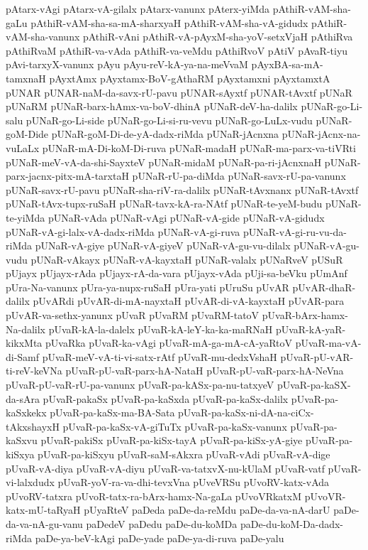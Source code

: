 {pAtarx-vAgi
pAtarx-vA-gilalx
pAtarx-vanunx
pAterx-yiMda
pAthiR-vAM-sha-gaLu
pAthiR-vAM-sha-sa-mA-sharxyaH
pAthiR-vAM-sha-vA-gidudx
pAthiR-vAM-sha-vanunx
pAthiR-vAni
pAthiR-vA-pAyxM-sha-yoV-setxVjaH
pAthiRva
pAthiRvaM
pAthiR-va-vAda
pAthiR-va-veMdu
pAthiRvoV
pAtiV
pAvaR-tiyu
pAvi-tarxyX-vanunx
pAyu
pAyu-reV-kA-ya-na-meVvaM
pAyxBA-sa-mA-tamxnaH
pAyxtAmx
pAyxtamx-BoV-gAthaRM
pAyxtamxni
pAyxtamxtA
pUNAR
pUNAR-naM-da-savx-rU-pavu
pUNAR-sAyxtf
pUNAR-tAvxtf
pUNaR
pUNaRM
pUNaR-barx-hAmx-va-boV-dhinA
pUNaR-deV-ha-dalilx
pUNaR-go-Li-salu
pUNaR-go-Li-side
pUNaR-go-Li-si-ru-vevu
pUNaR-go-LuLx-vudu
pUNaR-goM-Dide
pUNaR-goM-Di-de-yA-dadx-riMda
pUNaR-jAcnxna
pUNaR-jAcnx-na-vuLaLx
pUNaR-mA-Di-koM-Di-ruva
pUNaR-madaH
pUNaR-ma-parx-va-tiVRti
pUNaR-meV-vA-da-shi-SayxteV
pUNaR-midaM
pUNaR-pa-ri-jAcnxnaH
pUNaR-parx-jacnx-pitx-mA-tarxtaH
pUNaR-rU-pa-diMda
pUNaR-savx-rU-pa-vanunx
pUNaR-savx-rU-pavu
pUNaR-sha-riV-ra-dalilx
pUNaR-tAvxnanx
pUNaR-tAvxtf
pUNaR-tAvx-tupx-ruSaH
pUNaR-tavx-kA-ra-NAtf
pUNaR-te-yeM-budu
pUNaR-te-yiMda
pUNaR-vAda
pUNaR-vAgi
pUNaR-vA-gide
pUNaR-vA-gidudx
pUNaR-vA-gi-lalx-vA-dadx-riMda
pUNaR-vA-gi-ruva
pUNaR-vA-gi-ru-vu-da-riMda
pUNaR-vA-giye
pUNaR-vA-giyeV
pUNaR-vA-gu-vu-dilalx
pUNaR-vA-gu-vudu
pUNaR-vAkayx
pUNaR-vA-kayxtaH
pUNaR-valalx
pUNaRveV
pUSuR
pUjayx
pUjayx-rAda
pUjayx-rA-da-vara
pUjayx-vAda
pUji-sa-beVku
pUmAnf
pUra-Na-vanunx
pUra-ya-nupx-ruSaH
pUra-yati
pUruSu
pUvAR
pUvAR-dhaR-dalilx
pUvARdi
pUvAR-di-mA-nayxtaH
pUvAR-di-vA-kayxtaH
pUvAR-para
pUvAR-va-sethx-yanunx
pUvaR
pUvaRM
pUvaRM-tatoV
pUvaR-bArx-hamx-Na-dalilx
pUvaR-kA-la-dalelx
pUvaR-kA-leY-ka-ka-maRNaH
pUvaR-kA-yaR-kikxMta
pUvaRka
pUvaR-ka-vAgi
pUvaR-mA-ga-mA-cA-yaRtoV
pUvaR-ma-vA-di-Samf
pUvaR-meV-vA-ti-vi-satx-rAtf
pUvaR-mu-dedxVshaH
pUvaR-pU-vAR-ti-reV-keVNa
pUvaR-pU-vaR-parx-hA-NataH
pUvaR-pU-vaR-parx-hA-NeVna
pUvaR-pU-vaR-rU-pa-vanunx
pUvaR-pa-kASx-pa-nu-tatxyeV
pUvaR-pa-kaSX-da-sAra
pUvaR-pakaSx
pUvaR-pa-kaSxda
pUvaR-pa-kaSx-dalilx
pUvaR-pa-kaSxkekx
pUvaR-pa-kaSx-ma-BA-Sata
pUvaR-pa-kaSx-ni-dA-na-ciCx-tAkxshayxH
pUvaR-pa-kaSx-vA-giTuTx
pUvaR-pa-kaSx-vanunx
pUvaR-pa-kaSxvu
pUvaR-pakiSx
pUvaR-pa-kiSx-tayA
pUvaR-pa-kiSx-yA-giye
pUvaR-pa-kiSxya
pUvaR-pa-kiSxyu
pUvaR-saM-sAkxra
pUvaR-vAdi
pUvaR-vA-dige
pUvaR-vA-diya
pUvaR-vA-diyu
pUvaR-va-tatxvX-nu-kUlaM
pUvaR-vatf
pUvaR-vi-lalxdudx
pUvaR-yoV-ra-va-dhi-tevxVna
pUveVRSu
pUvoRV-katx-vAda
pUvoRV-tatxra
pUvoR-tatx-ra-bArx-hamx-Na-gaLa
pUvoVRkatxM
pUvoVR-katx-mU-taRyaH
pUyaRteV
paDeda
paDe-da-reMdu
paDe-da-va-nA-darU
paDe-da-va-nA-gu-vanu
paDedeV
paDedu
paDe-du-koMDa
paDe-du-koM-Da-dadx-riMda
paDe-ya-beV-kAgi
paDe-yade
paDe-ya-di-ruva
paDe-yalu
}
